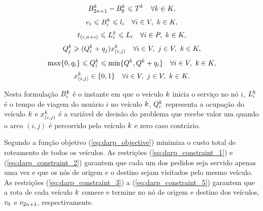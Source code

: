 %
\begin{equation} \label{eq:darp_constraint_9}
  B^k_{2n + 1}
  -
  B^k_{0}
  \leqslant
  T^k
  \quad
  \forall k \in K,
\end{equation}
%
\begin{equation} \label{eq:darp_constraint_10}
  e_i 
  \leqslant
  B^k_{i}
  \leqslant
  l_i
  \quad
  \forall i \in V,
  \ k \in K,
\end{equation}
%
\begin{equation} \label{eq:darp_constraint_11}
  t_{(i,n + i)}
  \leqslant
  L_i^{k}
  \leqslant
  L_i
  \quad
  \forall i \in P,
  \ k \in K,
\end{equation}
%
\begin{equation} \label{eq:darp_constraint_7}
  Q^{k}_j
  \geqslant
  (Q^{k}_i + q_j)
  x_{(i, j)}^{k} 
  \quad
  \forall i \in V, 
  \ j \in V, 
  \ k \in K,
\end{equation}
%
\begin{equation} \label{eq:darp_constraint_12}
  \max \{0, q_{i}\}
  \leqslant
  Q^{k}_i
  \leqslant
  \min \{Q^{k}, Q^{k} + q_{i}\}
  \quad
  \forall i \in V,
  \ k \in K,
\end{equation}
%
\begin{equation} \label{eq:darp_constraint_13}
  x_{(i, j)}^{k} \in \{0, 1\}
  \quad
  \forall i \in V,
  \ j \in V,
  \ k \in K.
\end{equation}

Nesta formulação $B_i^k$ é o instante em que o veículo $k$ inicia
o serviço no nó $i$, 
$L^k_i$ é o tempo de viagem do usuário $i$ no veículo 
$k$, 
$Q^{k}_i$ representa a ocupação do veículo $k$
e 
$x_{(i, j)}^{k}$ é a variável de decisão do problema que recebe valor 
um quando o arco $(i, j)$ é percorrido pelo veículo $k$ e zero caso 
contrário.

Segundo \textcite{cordeau_branch-and-cut_2006}
a função objetivo (\ref{eq:darp_objective})  minimiza o custo total de 
roteamento de todos os veículos. 
As restrições (\ref{eq:darp_constraint_1}) e (\ref{eq:darp_constraint_2}) 
garantem que cada um dos pedidos seja servido apenas uma vez e que os nós de 
origem e o destino sejam visitados pelo mesmo veículo.
As restrições (\ref{eq:darp_constraint_3}) a (\ref{eq:darp_constraint_5})
garantem que a rota de cada veículo $k$ comece e termine no nó de origem
e destino dos veículos, $v_{0}$ e $v_{2n + 1}$, respectivamente.

